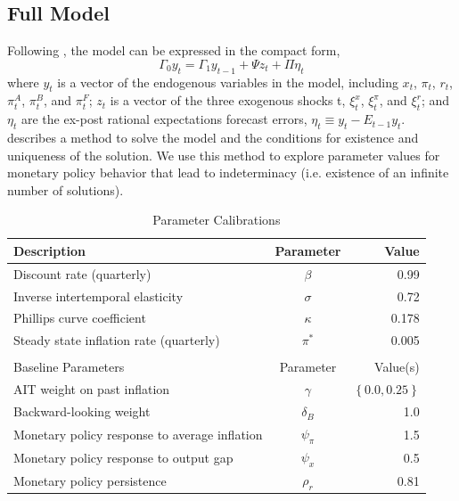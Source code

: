 \documentclass[english,authoryear,12pt]{elsarticle}
\begin{document}
\subsection{Full Model}

Following \citet{sims2002}, the model can be expressed in the compact form,
\begin{equation}
	\Gamma_0 y_t = \Gamma_1 y_{t-1} + \Psi z_t + \Pi \eta_t
\end{equation}
where $y_t$ is a vector of the endogenous variables in the model, including $x_t$, $\pi_t$, $r_t$, $\pi_t^A$, $\pi_t^B$, and $\pi_t^F$; $z_t$ is a vector of the three exogenous shocks t, $\xi_t^x$, $\xi_t^\pi$, and $\xi_t^r$; and $\eta_t$ are the ex-post rational expectations forecast errors, $\eta_t \equiv y_t - E_{t-1} y_t$. \citet{sims2002} describes a method to solve the model and the conditions for existence and uniqueness of the solution. We use this method to explore parameter values for monetary policy behavior that lead to indeterminacy (i.e. existence of an infinite number of solutions).

\begin{table}[htp]
	\captionsetup{justification=centering}
	\caption{Parameter Calibrations}\label{tb:parms}
	\begin{center}
		\vspace*{-1pc}\begin{tabular}{lcr}
			Description & Parameter & Value \\ \hline
			Discount rate (quarterly) & $\beta$ & 0.99 \\
			Inverse intertemporal elasticity & $\sigma$ & 0.72 \\
			Phillips curve coefficient & $\kappa$ & 0.178 \\
			Steady state inflation rate (quarterly) & $\pi^*$ & 0.005 \\ [0.25pc]
			\hline \\ [-0.25pc]
			Baseline Parameters & Parameter & Value(s) \\ \hline
			AIT weight on past inflation & $\gamma$ & $\left\{ 0.0, 0.25 \right\}$ \\
			Backward-looking weight & $\delta_B$ & 1.0 \\
			Monetary policy response to average inflation & $\psi_\pi$ & 1.5 \\
			Monetary policy response to output gap & $\psi_x$ & 0.5 \\
			Monetary policy persistence & $\rho_r$ & 0.81 \\ \hline
		\end{tabular}
	\end{center}
\end{table}
\end{document}

